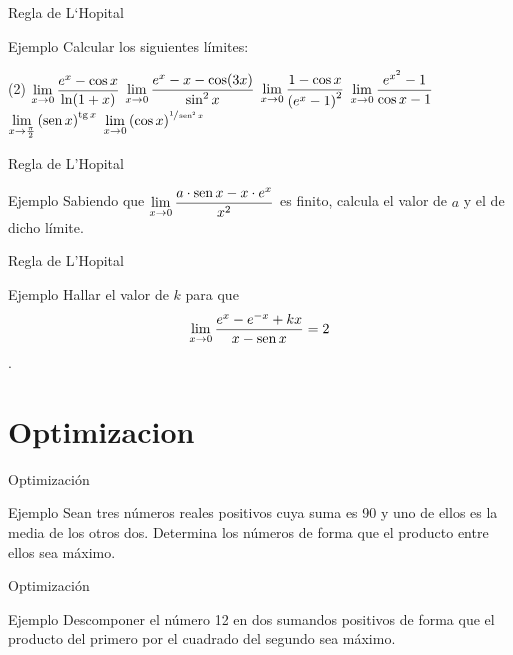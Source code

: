 \documentclass[8pt]{beamer}
\begin{document}
\begin{frame}[t]{Regla de L`Hopital}
\begin{exampleblock}{Ejemplo}
Calcular los siguientes límites:
\begin{tasks}[label=\alph*)](2)
\task $\displaystyle \lim_{x \rightarrow 0}{\dfrac{e^x - \cos x}{\ln(1+x)}}$
\task $\displaystyle \lim_{x \rightarrow 0}{\dfrac{e^x-x-\cos(3x)}{\sin^2x}}$
\task $\displaystyle \lim_{x \rightarrow 0}{\dfrac{1-\cos x}{\left( e^x-1 \right)^2}}$
\task $\displaystyle \lim_{x \rightarrow 0}{\dfrac{e^{x^2}-1}{\cos x-1}}$
\task $\displaystyle \lim_{x \rightarrow \frac{\pi}{2}}{\left( \mathop{\rm sen}\nolimits x \right)^{\mathop{\rm tg}\nolimits x}}$
\task $\displaystyle \lim_{x \rightarrow 0}{\left( \cos x \right)^{\sfrac{1}{\mathop{\rm sen}\nolimits^2 x}}}$
\end{tasks}
\end{exampleblock}
\end{frame}

\begin{frame}[t]{Regla de L'Hopital}
\begin{exampleblock}{Ejemplo}
Sabiendo que $\displaystyle \lim_{x \rightarrow 0}{\dfrac{a\cdot \mathop{\rm sen}\nolimits x-x\cdot e^x}{x^2}}$ es finito, calcula el valor de $a$ y el de dicho límite.
\end{exampleblock}
\end{frame}

\begin{frame}[t]{Regla de L'Hopital}
\begin{exampleblock}{Ejemplo}
Hallar el valor de $k$ para que \[\displaystyle \lim_{x \rightarrow 0}{\dfrac{e^x-e^{-x}+kx}{x -\mathop{\rm sen}\nolimits x}}=2 \].
\end{exampleblock}
\end{frame}

\section{Optimizacion}

\begin{frame}[t]{Optimización}
\begin{exampleblock}{Ejemplo}
Sean tres números reales positivos cuya suma es 90 y uno de ellos es la media de los
otros dos. Determina los números de forma que el producto entre ellos sea máximo.
\end{exampleblock}
\pause

\end{frame}


\begin{frame}[t]{Optimización}
\begin{exampleblock}{Ejemplo}
Descomponer el número 12 en dos sumandos positivos de forma que el producto
del primero por el cuadrado del segundo sea máximo.
\end{exampleblock}
\end{frame}
\end{document}
